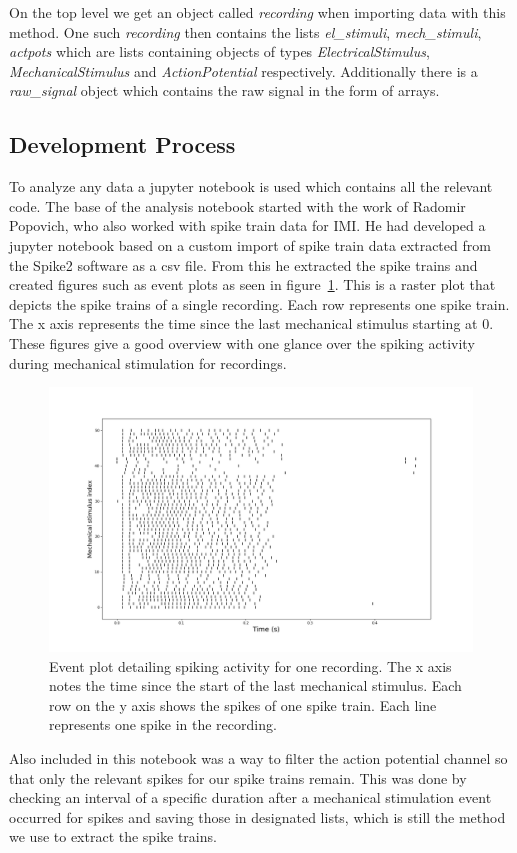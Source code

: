 On the top level we get an object called \textit{recording} when importing data with this method. One such \textit{recording} then contains the lists \textit{el\_stimuli}, \textit{mech\_stimuli}, \textit{actpots} which are lists containing objects of types \textit{ElectricalStimulus}, \textit{MechanicalStimulus} and \textit{ActionPotential} respectively. Additionally there is a \textit{raw\_signal} object which contains the raw signal in the form of arrays.


\subsection{Development Process}
To analyze any data a jupyter notebook is used which contains all the relevant code. The base of the analysis notebook started with the work of Radomir Popovich, who also worked with spike train data for IMI. He had developed a jupyter notebook based on a custom import of spike train data extracted from the Spike2 software as a csv file. From this he extracted the spike trains and created figures such as event plots as seen in figure~\ref{fig:eventplot}. This is a raster plot that depicts the spike trains of a single recording. Each row represents one spike train. The x axis represents the time since the last mechanical stimulus starting at 0. These figures give a good overview with one glance over the spiking activity during mechanical stimulation for recordings.
\begin{figure}
	\includegraphics[width = \textwidth]{src/pic/11_12_13U1b_event}
	\caption{Event plot detailing spiking activity for one recording. The x axis notes the time since the start of the last mechanical stimulus. Each row on the y axis shows the spikes of one spike train. Each line represents one spike in the recording.}
	\label{fig:eventplot}
\end{figure}
Also included in this notebook was a way to filter the action potential channel so that only the relevant spikes for our spike trains remain. This was done by checking an interval of a specific duration after a mechanical stimulation event occurred for spikes and saving those in designated lists, which is still the method we use to extract the spike trains.

